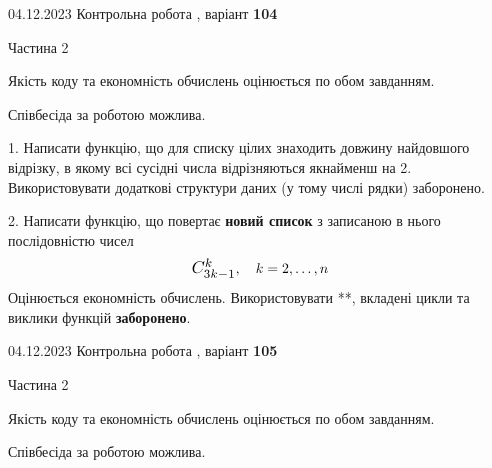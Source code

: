 \documentclass[12pt, ukrainian]{article}
\begin{document}
{{{%



\begin {Huge}
{{04.12.2023 Контрольна робота , варіант  \No \textbf { 104 }\par}}

\begin{center}Частина 2
\end{center}
\vspace{10mm}
\end {Huge}

{
\begin {Large}
Якість коду та економність обчислень оцінюється по обом завданням.

Співбесіда за роботою можлива.

\vspace{5mm}

1. Написати функцію, що для списку цілих знаходить довжину найдовшого відрізку, в якому всі сусідні числа відрізняються якнайменш на 2. Використовувати додаткові структури даних (у тому числі рядки) заборонено.

\vspace{10mm}



2. 
Написати функцію, що повертає \textbf{новий список} з записаною в нього послідовністю чисел
$$\scalebox{1.2}{$C_{3k-1}^{k}$}, \quad k=2,\ldots,n$$
Оцінюється економність обчислень. Використовувати **, вкладені цикли та виклики функцій \textbf{заборонено}.

\end{Large}\newpage




\begin {Huge}
{{04.12.2023 Контрольна робота , варіант  \No \textbf { 105 }\par}}

\begin{center}Частина 2
\end{center}
\vspace{10mm}
\end {Huge}

{
\begin {Large}
Якість коду та економність обчислень оцінюється по обом завданням.

Співбесіда за роботою можлива.

\vspace{5mm}


\end{Large}}}}}}
\end{document}
